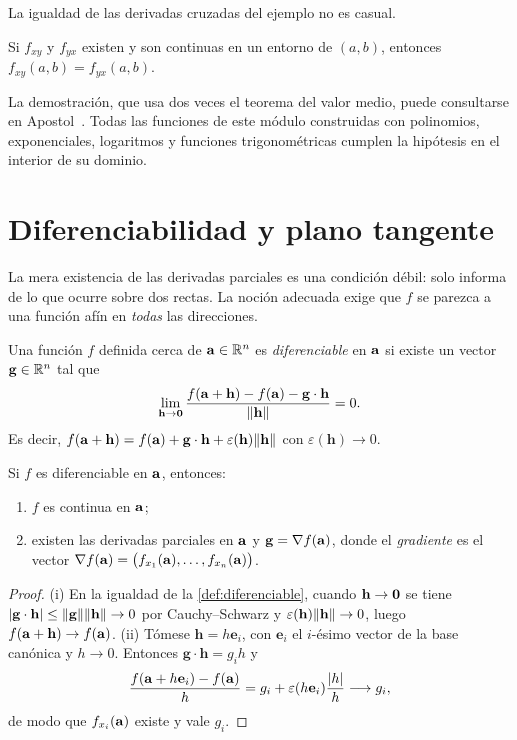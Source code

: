 La igualdad de las derivadas cruzadas del ejemplo no es casual.

\begin{teorema}[Schwarz]\label{teo:schwarz}
Si $f_{xy}$ y $f_{yx}$ existen y son continuas en un entorno de $(a,b)$, entonces $f_{xy}(a,b)=f_{yx}(a,b)$.
\end{teorema}

La demostración, que usa dos veces el teorema del valor medio, puede consultarse en Apostol~\cite[cap.~8]{apostol2}. Todas las funciones de este módulo construidas con polinomios, exponenciales, logaritmos y funciones trigonométricas cumplen la hipótesis en el interior de su dominio.

\section{Diferenciabilidad y plano tangente}

La mera existencia de las derivadas parciales es una condición débil: solo informa de lo que ocurre sobre dos rectas. La noción adecuada exige que $f$ se parezca a una función afín en \emph{todas} las direcciones.

\begin{definicion}[Diferenciabilidad]\label{def:diferenciable}
Una función $f$ definida cerca de $\mathbf{a}\in\mathbb{R}^n$ es \emph{diferenciable} en $\mathbf{a}$ si existe un vector $\mathbf g\in\mathbb{R}^n$ tal que
\[
\lim_{\mathbf h\to\mathbf{0}}\frac{f(\mathbf{a}+\mathbf h)-f(\mathbf{a})-\mathbf g\cdot\mathbf h}{\lVert\mathbf h\rVert}=0 .
\]
Es decir, $f(\mathbf{a}+\mathbf h)=f(\mathbf{a})+\mathbf g\cdot\mathbf h+\varepsilon(\mathbf h)\lVert\mathbf h\rVert$ con $\varepsilon(\mathbf h)\to0$.
\end{definicion}

\begin{teorema}\label{teo:diferenciable}
Si $f$ es diferenciable en $\mathbf{a}$, entonces:
\begin{enumerate}
  \item $f$ es continua en $\mathbf{a}$;
  \item existen las derivadas parciales en $\mathbf{a}$ y $\mathbf g=\nabla f(\mathbf{a})$, donde el \emph{gradiente} es el vector $\nabla f(\mathbf{a})=\bigl(f_{x_1}(\mathbf{a}),\dots,f_{x_n}(\mathbf{a})\bigr)$.
\end{enumerate}
\end{teorema}

\begin{proof}
(i) En la igualdad de la \cref{def:diferenciable}, cuando $\mathbf h\to\mathbf{0}$ se tiene $\lvert\mathbf g\cdot\mathbf h\rvert\le\lVert\mathbf g\rVert\lVert\mathbf h\rVert\to0$ por Cauchy--Schwarz y $\varepsilon(\mathbf h)\lVert\mathbf h\rVert\to0$, luego $f(\mathbf{a}+\mathbf h)\to f(\mathbf{a})$. (ii) Tómese $\mathbf h=h\mathbf e_i$, con $\mathbf e_i$ el $i$-ésimo vector de la base canónica y $h\to0$. Entonces $\mathbf g\cdot\mathbf h=g_ih$ y
\[
\frac{f(\mathbf{a}+h\mathbf e_i)-f(\mathbf{a})}{h}=g_i+\varepsilon(h\mathbf e_i)\frac{\lvert h\rvert}{h}\longrightarrow g_i,
\]
de modo que $f_{x_i}(\mathbf{a})$ existe y vale $g_i$.
\end{proof}

